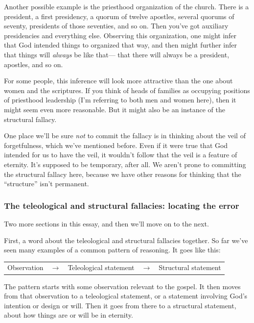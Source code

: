 		Another possible example is the priesthood organization of the church.
		There is a president,
			a first presidency,
				a quorum of twelve apostles,
					several quorums of seventy,
						presidents of those seventies,
							and so on.
		Then you've got auxiliary presidencies and everything else.
		Observing this organization,
			one might infer that God intended things to organized that way,
				and then might further infer that things will \textit{always} be like that---%
					that there will always be a president,
						apostles, and so on.
		
		For some people,
			this inference will look more attractive than the one about women and the scriptures.
		If you think of heads of families as occupying positions of priesthood leadership (I'm referring to both men and women here),
			then it might seem even more reasonable.
		But it might also be an instance of the structural fallacy.
		
		One place we'll be sure \textit{not} to commit the fallacy is in thinking about the veil of forgetfulness,
			which we've mentioned before.
		Even if it were true that God intended for us to have the veil,
			it wouldn't follow that the veil is a feature of eternity.
		It's supposed to be temporary,
			after all.
		We aren't prone to committing the structural fallacy here,
			because we have other reasons for thinking that the ``structure'' isn't permanent.
	
	\subsubsection{The teleological and structural fallacies: locating the error}
	
		Two more sections in this essay,
			and then we'll move on to the next.
		
		First,
			a word about the teleological and structural fallacies together.
		So far we've seen many examples of a common pattern of reasoning.
		It goes like this:
		
		\begin{table}[H]
		\centering
		\begin{tabular}{p{4cm}p{0.5cm}p{4cm}p{0.5cm}p{4cm}}
		Observation & $\rightarrow$ & Teleological statement & $\rightarrow$ & Structural statement
		\end{tabular}
		\end{table}
		
		The pattern starts with some observation relevant to the gospel.
		It then moves from that observation to a teleological statement,
			or a statement involving God's intention or design or will.
		Then it goes from there to a structural statement,
			about how things are or will be in eternity.
		
